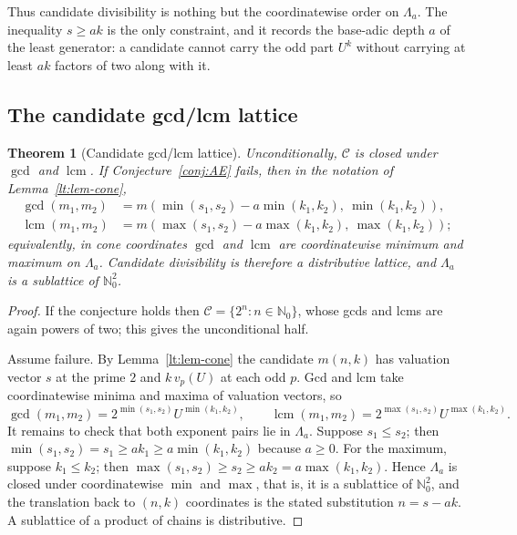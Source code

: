 \documentclass[11pt,oneside]{article}
\newtheorem{theorem}{Theorem}[section]
\theoremstyle{definition}
\theoremstyle{remark}
\newcommand{\Nzero}{\mathbb N_0}
\newcommand{\Cand}{\mathcal C}
\newcommand{\vpp}[2]{v_{#1}\!\left(#2\right)}
\begin{document}
Thus candidate divisibility is nothing but the coordinatewise order on $\Lambda_a$.  The
inequality $s\ge ak$ is the only constraint, and it records the base-adic depth $a$ of the least
generator: a candidate cannot carry the odd part $U^k$ without carrying at least $ak$ factors of
two along with it.

\subsection{The candidate gcd/lcm lattice}

\begin{theorem}[Candidate gcd/lcm lattice]
\label{lt:thm-gcd-lcm}
Unconditionally, $\Cand$ is closed under $\gcd$ and $\operatorname{lcm}$.  If
Conjecture~\ref{conj:AE} fails, then in the notation of Lemma~\ref{lt:lem-cone},
\[
\begin{aligned}
 \gcd(m_1,m_2)
 &=m\!\left(\min(s_1,s_2)-a\min(k_1,k_2),\ \min(k_1,k_2)\right),\\
 \operatorname{lcm}(m_1,m_2)
 &=m\!\left(\max(s_1,s_2)-a\max(k_1,k_2),\ \max(k_1,k_2)\right);
\end{aligned}
\]
equivalently, in cone coordinates $\gcd$ and $\operatorname{lcm}$ are coordinatewise minimum
and maximum on $\Lambda_a$.  Candidate divisibility is therefore a distributive lattice, and
$\Lambda_a$ is a sublattice of $\Nzero^2$.
\end{theorem}

\begin{proof}
If the conjecture holds then $\Cand=\{2^n:n\in\Nzero\}$, whose gcds and lcms are again powers
of two; this gives the unconditional half.

Assume failure.  By Lemma~\ref{lt:lem-cone} the candidate $m(n,k)$ has valuation vector
$s$ at the prime $2$ and $k\,\vpp{p}{U}$ at each odd $p$.  Gcd and lcm take coordinatewise
minima and maxima of valuation vectors, so
\[
 \gcd(m_1,m_2)=2^{\min(s_1,s_2)}U^{\min(k_1,k_2)},
 \qquad
 \operatorname{lcm}(m_1,m_2)=2^{\max(s_1,s_2)}U^{\max(k_1,k_2)} .
\]
It remains to check that both exponent pairs lie in $\Lambda_a$.  Suppose $s_1\le s_2$; then
$\min(s_1,s_2)=s_1\ge ak_1\ge a\min(k_1,k_2)$ because $a\ge0$.  For the maximum, suppose
$k_1\le k_2$; then $\max(s_1,s_2)\ge s_2\ge ak_2=a\max(k_1,k_2)$.  Hence $\Lambda_a$ is closed
under coordinatewise $\min$ and $\max$, that is, it is a sublattice of $\Nzero^2$, and the
translation back to $(n,k)$ coordinates is the stated substitution $n=s-ak$.  A sublattice of a
product of chains is distributive.
\end{proof}
\end{document}
